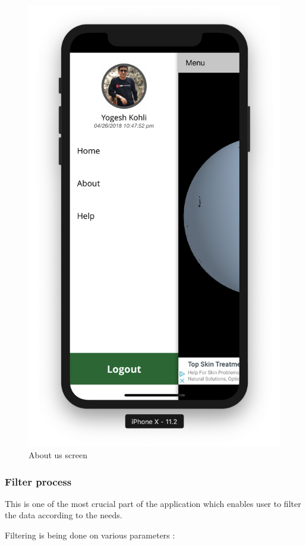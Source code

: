 \begin{itemize}
        \begin{figure}[H]
            \centering
            \includegraphics[width=0.5\linewidth]{figures/ch2/side_menu.png}
            \caption{\label{fig:pass_recovery_1} About us screen}
        \end{figure}
        
            \newpage
            
    \end{itemize}

\subsubsection{Filter process}

This is one of the most crucial part of the application which enables user to filter the data according to the needs.

Filtering is being done on various parameters :


